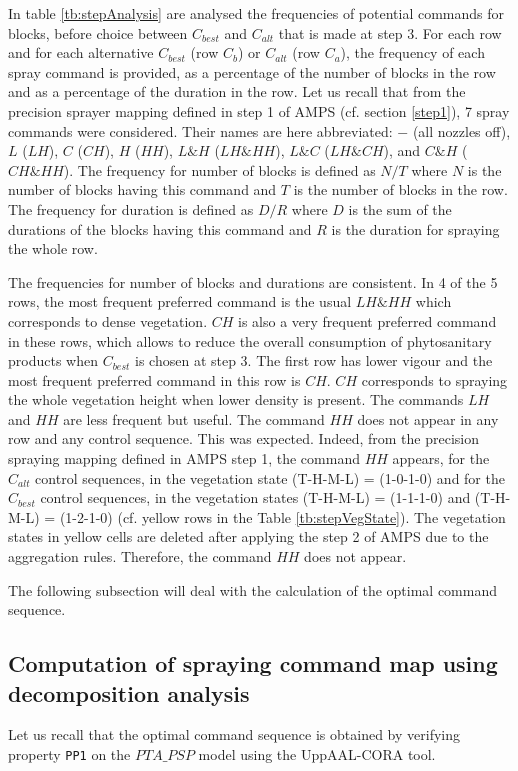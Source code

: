 \documentclass[preprint,3p,times,twocolumn]{elsarticle}
\begin{document}
In table \ref{tb:stepAnalysis} are analysed the frequencies of potential commands for blocks, before choice between $C_{best}$ and $C_{alt}$ that is made at step 3. For each row and for each alternative $C_{best}$ (row $C_{b}$) or $C_{alt}$ (row $C_{a}$), the frequency of each spray command is provided, as a percentage of the number of blocks in the row and as a percentage of the duration in the row. Let us recall that from the precision sprayer mapping defined in step 1 of AMPS (cf. section \ref{step1}), 7 spray commands were considered. Their names are here abbreviated: $-$ (all nozzles off), $L$ ($LH$), $C$ ($CH$), $H$ ($HH$), $L\&H$ ($LH\&HH$), $L\&C$ ($LH\&CH$), and $C\&H$ ($CH\&HH$). The frequency for number of blocks is defined as $N/T$ where $N$ is the number of blocks having this command and $T$ is the number of blocks in the row. The frequency for duration is defined as $D/R$ where $D$ is the sum of the durations of the blocks having this command and $R$ is the duration for spraying the whole row.

The frequencies for number of blocks and durations are consistent. In 4 of the 5 rows, the most frequent preferred command is the usual $LH\&HH$ which corresponds to dense vegetation. $CH$ is also a very frequent preferred command in these rows, which allows to reduce the overall consumption of phytosanitary products when $C_{best}$ is chosen at step 3. The first row has lower vigour and the most frequent preferred command in this row is $CH$. $CH$ corresponds to spraying the whole vegetation height when lower density is present. The commands $LH$ and $HH$ are less frequent but useful. The command $HH$ does not appear in any row and any control sequence. This was expected. Indeed, from the precision spraying mapping defined in AMPS step 1, the command $HH$ appears, for the $C_{alt}$ control sequences, in the vegetation state (T-H-M-L) = (1-0-1-0) and for the $C_{best}$ control sequences, in the vegetation states (T-H-M-L) = (1-1-1-0) and (T-H-M-L) = (1-2-1-0) (cf. yellow rows in the Table \ref{tb:stepVegState}). The vegetation states in yellow cells are deleted after applying the step 2 of AMPS due to the aggregation rules. Therefore, the command $HH$ does not appear. 

The following subsection will deal with the calculation of the optimal command sequence. 

\subsection{Computation of spraying command map  using decomposition analysis}
Let us recall that the optimal command sequence is obtained by verifying property \texttt{PP1} on the $PTA\_PSP$ model using the UppAAL-CORA tool.
\end{document}
